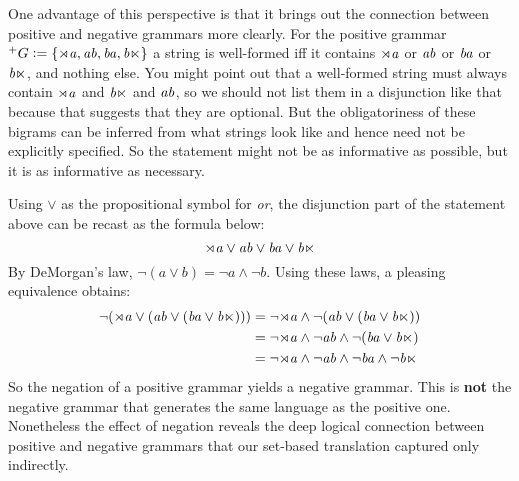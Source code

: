 One advantage of this perspective is that it brings out the connection between positive and negative grammars more clearly.
For the positive grammar $^+ G \mathrel{\mathop:}= \left \{ \mathit{\rtimes a}, \mathit{ab}, \mathit{ba}, \mathit{b \ltimes} \right \}$ a string is well-formed iff it contains $\mathit{\rtimes a}$ or $\mathit{ab}$ or $\mathit{ba}$ or $\mathit{b \ltimes}$, and nothing else.
You might point out that a well-formed string must always contain $\mathit{\rtimes a}$ and $\mathit{b \ltimes}$ and $\mathit{ab}$, so we should not list them in a disjunction like that because that suggests that they are optional.
But the obligatoriness of these bigrams can be inferred from what strings look like and hence need not be explicitly specified.
So the statement might not be as informative as possible, but it is as informative as necessary.

Using $\vee$ as the propositional symbol for \emph{or}, the disjunction part of the statement above can be recast as the formula below:
%
\[
    \mathit{\rtimes a}
    \vee
    \mathit{ab}
    \vee
    \mathit{ba}
    \vee
    \mathit{b\ltimes}
\]
%
By DeMorgan's law, $\neg (a \vee b) = \neg a \wedge \neg b$.
Using these laws, a pleasing equivalence obtains:
%
\begin{align*}
    \neg (
    \mathit{\rtimes a}
    \vee
        (\mathit{ab}
        \vee
            (\mathit{ba}
            \vee
            \mathit{b\ltimes}
            )
        )
    )
    & = 
    \neg
    \mathit{\rtimes a}
    \wedge
        \neg 
        (\mathit{ab}
        \vee
            (\mathit{ba}
            \vee
            \mathit{b\ltimes}
            )
        )
    \\
    & = 
    \neg
    \mathit{\rtimes a}
    \wedge
        \neg 
        \mathit{ab}
        \wedge
            \neg
            (\mathit{ba}
            \vee
            \mathit{b\ltimes}
            )
    \\
    & = 
    \neg
    \mathit{\rtimes a}
    \wedge
        \neg 
        \mathit{ab}
        \wedge
            \neg
            \mathit{ba}
            \wedge
            \neg
            \mathit{b\ltimes}
\end{align*}
%
So the negation of a positive grammar yields a negative grammar.
This is \textbf{not} the negative grammar that generates the same language as the positive one.
Nonetheless the effect of negation reveals the deep logical connection between positive and negative grammars that our set-based translation captured only indirectly.

